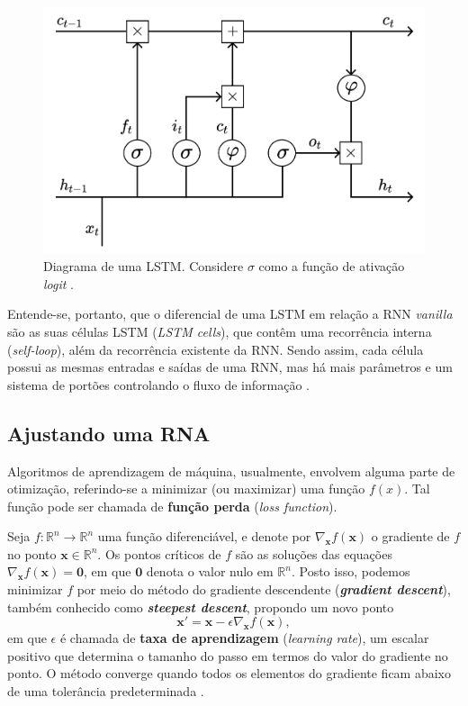 \documentclass[twoside]{automatextcc}
\newcommand{\R}{\mathds{R}}
\newcommand{\bs}[1]{\boldsymbol{#1}}
\begin{document}
\begin{figure}[H]
    \centering
    \includegraphics[width=\textwidth]{figuras/lstm_cell.pdf}
	\caption{Diagrama de uma LSTM. Considere $\sigma$ como a função de ativação \textit{logit} \citep[adaptado de][]{kamath2019}.}
\end{figure}

Entende-se, portanto, que o diferencial de uma LSTM em relação a RNN \textit{vanilla} são as suas células LSTM (\textit{LSTM cells}), que contêm uma recorrência interna (\textit{self-loop}), além da recorrência existente da RNN. Sendo assim, cada célula possui as mesmas entradas e saídas de uma RNN, mas há mais parâmetros e um sistema de portões controlando o fluxo de informação \citep{goodfellow2016}.


\subsection{Ajustando uma RNA}
Algoritmos de aprendizagem de máquina, usualmente, envolvem alguma parte de otimização, referindo-se a minimizar (ou maximizar) uma função $f(x)$. Tal função pode ser chamada de \textbf{função perda} (\textit{loss function}). 


Seja $f: \R^n \rightarrow \R^n$ uma função diferenciável, e denote por $\nabla_{\bs{x}} f(\bs{x})$ o gradiente de $f$ no ponto $\bs{x}\in\R^n$. Os pontos críticos de $f$ são as soluções das equações $\nabla_{\bs{x}} f(\bs{x}) = \bs{0}$, em que $\bs{0}$ denota o valor nulo em $\R^n$. Posto isso, podemos minimizar $f$ por meio do método  do gradiente descendente (\textit{\textbf{gradient descent}}), também conhecido como \textit{\textbf{steepest descent}}, propondo um novo ponto
\begin{equation*}
    \bs{x'} = \bs{x} - \epsilon \nabla_{\bs{x}} f(\bs{x}),
\end{equation*}
em que $\epsilon$ é chamada de \textbf{taxa de aprendizagem} (\textit{learning rate}), um escalar positivo que determina o tamanho do passo em termos do valor do gradiente no ponto. O método converge quando todos os elementos do gradiente ficam abaixo de uma tolerância predeterminada \citep{goodfellow2016}. 
\end{document}
